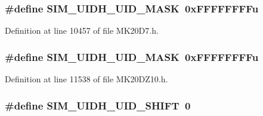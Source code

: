 \subsubsection[{\texorpdfstring{S\+I\+M\+\_\+\+U\+I\+D\+H\+\_\+\+U\+I\+D\+\_\+\+M\+A\+SK}{SIM_UIDH_UID_MASK}}]{\setlength{\rightskip}{0pt plus 5cm}\#define S\+I\+M\+\_\+\+U\+I\+D\+H\+\_\+\+U\+I\+D\+\_\+\+M\+A\+SK~0x\+F\+F\+F\+F\+F\+F\+F\+Fu}\hypertarget{group___s_i_m___register___masks_ga313fa2a8e328043458a9ec1e3125c75f}{}\label{group___s_i_m___register___masks_ga313fa2a8e328043458a9ec1e3125c75f}


Definition at line 10457 of file M\+K20\+D7.\+h.

\subsubsection[{\texorpdfstring{S\+I\+M\+\_\+\+U\+I\+D\+H\+\_\+\+U\+I\+D\+\_\+\+M\+A\+SK}{SIM_UIDH_UID_MASK}}]{\setlength{\rightskip}{0pt plus 5cm}\#define S\+I\+M\+\_\+\+U\+I\+D\+H\+\_\+\+U\+I\+D\+\_\+\+M\+A\+SK~0x\+F\+F\+F\+F\+F\+F\+F\+Fu}\hypertarget{group___s_i_m___register___masks_ga313fa2a8e328043458a9ec1e3125c75f}{}\label{group___s_i_m___register___masks_ga313fa2a8e328043458a9ec1e3125c75f}


Definition at line 11538 of file M\+K20\+D\+Z10.\+h.

\subsubsection[{\texorpdfstring{S\+I\+M\+\_\+\+U\+I\+D\+H\+\_\+\+U\+I\+D\+\_\+\+S\+H\+I\+FT}{SIM_UIDH_UID_SHIFT}}]{\setlength{\rightskip}{0pt plus 5cm}\#define S\+I\+M\+\_\+\+U\+I\+D\+H\+\_\+\+U\+I\+D\+\_\+\+S\+H\+I\+FT~0}\hypertarget{group___s_i_m___register___masks_ga2984b4c4d6bb4339997aee03c8a263b1}{}\label{group___s_i_m___register___masks_ga2984b4c4d6bb4339997aee03c8a263b1}


